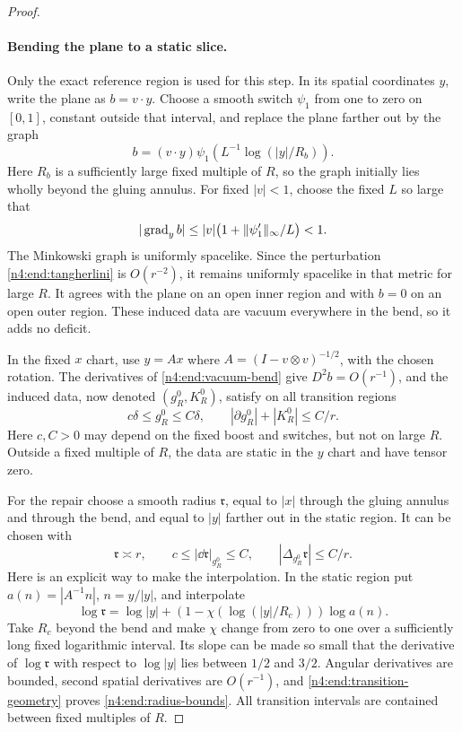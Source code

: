 \begin{proof}
\paragraph{Bending the plane to a static slice.}
Only the exact reference region is used for this step. In its spatial
coordinates \(y\), write the plane as \(b=v\cdot y\). Choose a smooth
switch \(\psi_1\) from one to zero on \([0,1]\), constant outside that
interval, and replace the plane farther out by the graph
\begin{equation}\label{n4:end:vacuum-bend}
 b=(v\cdot y)\psi_1\left(L^{-1}\log(|y|/R_b)\right).
\end{equation}
Here \(R_b\) is a sufficiently large fixed multiple of \(R\), so the
graph initially lies wholly beyond the gluing annulus. For fixed
\(|v|<1\), choose the fixed \(L\) so large that
\[
 |\operatorname{grad}_y b|
 \le |v|\bigl(1+\|\psi_1'\|_\infty/L\bigr)<1.
\]
The Minkowski graph is uniformly spacelike. Since the perturbation
\eqref{n4:end:tangherlini} is \(O(r^{-2})\), it remains uniformly spacelike
in that metric for large \(R\). It agrees with the plane on an open
inner region and with \(b=0\) on an open outer region. These induced
data are vacuum everywhere in the bend, so it adds no deficit.

In the fixed \(x\) chart, use \(y=Ax\) where
\(A=(I-v\otimes v)^{-1/2}\), with the chosen rotation. The derivatives
of \eqref{n4:end:vacuum-bend} give \(D^2b=O(r^{-1})\), and the induced
data, now denoted \((g_R^0,K_R^0)\), satisfy on all transition regions
\begin{equation}\label{n4:end:transition-geometry}
 c\delta\le g_R^0\le C\delta,\qquad
 |\partial g_R^0|+|K_R^0|\le C/r.
\end{equation}
Here \(c,C>0\) may depend on the fixed boost and switches, but not
on large \(R\). Outside a fixed multiple of \(R\), the data are static
in the \(y\) chart and have tensor zero.

For the repair choose a smooth radius \(\mathfrak r\), equal to
\(|x|\) through the gluing annulus and through the bend, and equal to
\(|y|\) farther out in the static region. It can be chosen with
\begin{equation}\label{n4:end:radius-bounds}
 \mathfrak r\asymp r,\qquad
 c\le|\dd\mathfrak r|_{g_R^0}\le C,
 \qquad |\Delta_{g_R^0}\mathfrak r|\le C/r.
\end{equation}
Here is an explicit way to make the interpolation. In the static region
put \(a(n)=|A^{-1}n|\), \(n=y/|y|\), and interpolate
\[
 \log\mathfrak r=\log|y|+(1-\chi(\log(|y|/R_c)))\log a(n).
\]
Take \(R_c\) beyond the bend and make \(\chi\) change from zero to one
over a sufficiently long fixed logarithmic interval. Its slope can be
made so small that the derivative of \(\log\mathfrak r\) with respect
to \(\log|y|\) lies between \(1/2\) and \(3/2\). Angular derivatives
are bounded, second spatial derivatives are \(O(r^{-1})\), and
\eqref{n4:end:transition-geometry} proves \eqref{n4:end:radius-bounds}.
All transition intervals are contained between fixed multiples of \(R\).


\end{proof}
